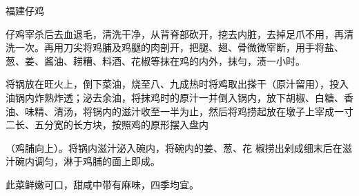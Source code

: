 \begin{recipe}{福建仔鸡}

\ingredients


\cooking

\step 仔鸡宰杀后去血退毛，清洗干净，从背脊部砍开，挖去内脏，去掉足爪不用，再清洗一次。再用刀尖将鸡脯及鸡腿的肉剖开，把腿、翅、骨微微宰断，用手将盐、葱、姜、酱油、耢糟、料酒、花椒等抹在鸡的内外，抹勻，渍一小时。

\step 将锅放在旺火上，倒下菜油，烧至八、九成热时将鸡取出搽干（原汁留用），投入油锅内炸熟炸透；泌去余油，将抹鸡时的原汁一并倒入锅内，放下胡椒、白糖、香油、味精、清汤，将锅内的滋汁收至一半为止，然后将鸡捞起放在墩子上宰成一寸二长、五分宽的长方块，按照鸡的原形摆入盘内

（鸡脯向上）。将锅内滋汁泌入碗内，将碗内的姜、葱、花 椒捞出剁成细末后在滋汁碗内调匀，淋于鸡脯的面上即成。

\notes

此菜鲜嫩可口，甜咸中带有麻味，四季均宜。

\end{recipe}

